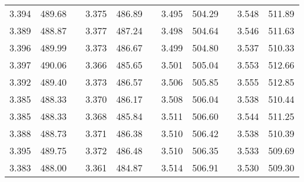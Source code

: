 \documentclass[12pt]{mwrep}
\begin{document}
\begin{table}[H]
\begin{tabularx}{\textwidth}{|Y|Z{16mm}|p{2mm}|Y|Z{16mm}|p{2mm}|Y|Z{16mm}|p{2mm}|Y|Z{16mm}|}
			3.394 & 489.68 && 3.375 & 486.89 && 3.495 & 504.29 && 3.548 & 511.89 \\
			3.389 & 488.87 && 3.377 & 487.24 && 3.498 & 504.64 && 3.546 & 511.63 \\
			3.396 & 489.99 && 3.373 & 486.67 && 3.499 & 504.80 && 3.537 & 510.33 \\
			3.397 & 490.06 && 3.366 & 485.65 && 3.501 & 505.04 && 3.553 & 512.66 \\
			3.392 & 489.40 && 3.373 & 486.57 && 3.506 & 505.85 && 3.555 & 512.85 \\
			3.385 & 488.33 && 3.370 & 486.17 && 3.508 & 506.04 && 3.538 & 510.44 \\
			3.385 & 488.33 && 3.368 & 485.84 && 3.511 & 506.60 && 3.544 & 511.25 \\
			3.388 & 488.73 && 3.371 & 486.38 && 3.510 & 506.42 && 3.538 & 510.39 \\
			3.395 & 489.75 && 3.372 & 486.48 && 3.510 & 506.35 && 3.533 & 509.69 \\
			3.383 & 488.00 && 3.361 & 484.87 && 3.514 & 506.91 && 3.530 & 509.30 \\
		\end{tabularx}
	\end{table}
	
\end{document}
